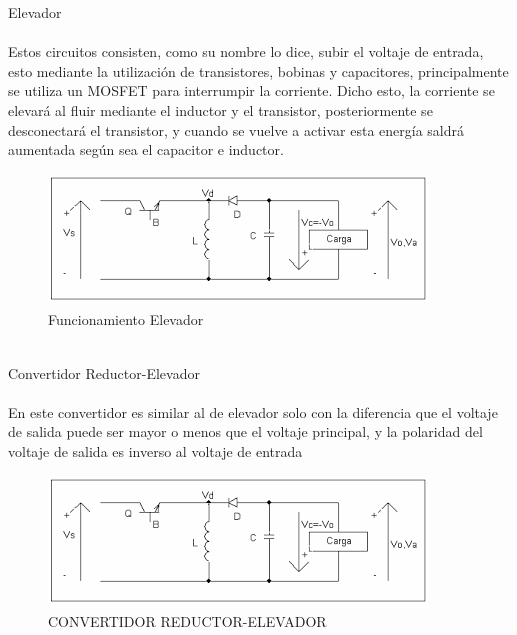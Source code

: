 \documentclass[12pt]{report}
\begin{document}
 {\Large Elevador}\\\\
 Estos circuitos consisten, como su nombre lo dice, subir el voltaje de entrada, esto mediante la utilización de transistores, bobinas y capacitores, principalmente se utiliza un MOSFET para interrumpir la corriente.
Dicho esto, la corriente se elevará al fluir mediante el inductor y el transistor, posteriormente se desconectará el transistor, y cuando se vuelve a activar esta energía saldrá aumentada según sea el capacitor e inductor. 
\\
 \begin{figure}[hbtp]
 \caption{Funcionamiento Elevador}
 \centering
 \includegraphics[scale=1]{Elevador.png}
 \end{figure}
 \\{ \Large Convertidor Reductor-Elevador}\\
 \\ En este convertidor es similar al de elevador solo con la diferencia que el voltaje de salida puede ser mayor o menos que el voltaje principal, y la polaridad del voltaje de salida es inverso al voltaje de entrada\\
 \begin{figure}[hbtp]
  \caption{CONVERTIDOR  REDUCTOR-ELEVADOR }
  \centering
  \includegraphics[scale=1]{REDUCTOR-ELEVADOR.png}
  \end{figure}
   
\end{document}
